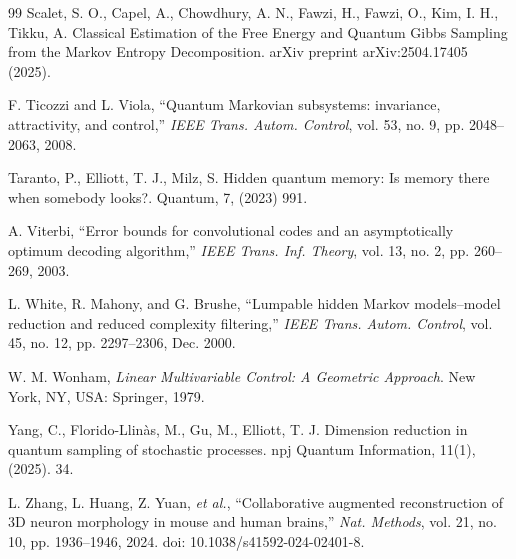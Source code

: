 \documentclass[12pt, reco]{article}
\begin{document}
\begin{thebibliography}{99}
 Scalet, S. O., Capel, A., Chowdhury, A. N., Fawzi, H., Fawzi, O., Kim, I. H.,   Tikku, A. Classical Estimation of the Free Energy and Quantum Gibbs Sampling from the Markov Entropy Decomposition. arXiv preprint arXiv:2504.17405  (2025).

F. Ticozzi and L. Viola, ``Quantum Markovian subsystems: invariance, attractivity, and control,'' \emph{IEEE Trans. Autom. Control}, vol. 53, no. 9, pp. 2048--2063, 2008.

 Taranto, P., Elliott, T. J.,   Milz, S.  Hidden quantum memory: Is memory there when somebody looks?. Quantum, 7,  (2023) 991.
    
A. Viterbi, ``Error bounds for convolutional codes and an asymptotically optimum decoding algorithm,'' \emph{IEEE Trans. Inf. Theory}, vol. 13, no. 2, pp. 260--269, 2003.

L. White, R. Mahony, and G. Brushe, ``Lumpable hidden Markov models--model reduction and reduced complexity filtering,'' \emph{IEEE Trans. Autom. Control}, vol. 45, no. 12, pp. 2297--2306, Dec. 2000.

W. M. Wonham, \emph{Linear Multivariable Control: A Geometric Approach}. New York, NY, USA: Springer, 1979.

 Yang, C., Florido-Llinàs, M., Gu, M.,  Elliott, T. J. Dimension reduction in quantum sampling of stochastic processes. npj Quantum Information, 11(1), (2025).  34.

L. Zhang, L. Huang, Z. Yuan, \emph{et al.}, ``Collaborative augmented reconstruction of 3D neuron morphology in mouse and human brains,'' \emph{Nat. Methods}, vol. 21, no. 10, pp. 1936--1946, 2024. doi: 10.1038/s41592-024-02401-8.

\end{thebibliography}
\end{document}
